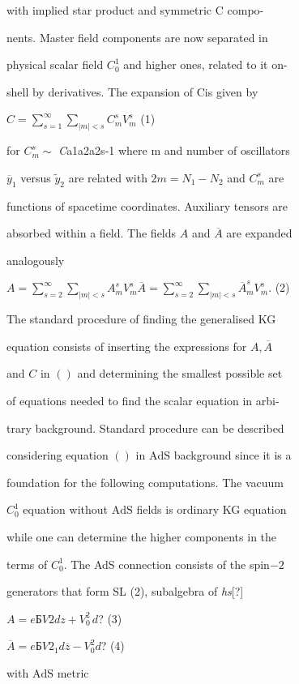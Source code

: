 \documentclass[a4paper,12pt]{article}
\begin{document}
with implied star product and symmetric $\mathrm{C}$ compo-

nents. Master field components are now separated in

physical scalar field $C_{0}^{1}$ and higher ones, related to it on-

shell by derivatives. The expansion of Cis given by
\begin{center}
$C=\displaystyle \sum_{s=1}^{\infty}\sum_{|m|<s}C_{m}^{s}V_{m}^{s}$   (1)
\end{center}
for $ C_{m}^{s}\sim$ {\it C}a1a2a2s-1 where $\mathrm{m}$ and number of oscillators

$\overline{y}_{1}$ versus $\tilde{y}_{2}$ are related with $2m=N_{1}-N_{2}$ and $C_{m}^{s}$ are

functions of spacetime coordinates. Auxiliary tensors are

absorbed within a field. The fields $A$ and $\overline{A}$ are expanded

analogously
\begin{center}
$A=\displaystyle \sum_{s=2}^{\infty}\sum_{|m|<s}A_{m}^{s}V_{m}^{s} \displaystyle \overline{A}=\sum_{s=2}^{\infty}\sum_{|m|<s}\overline{A}_{m}^{s}V_{m}^{s}$.   (2)
\end{center}
The standard procedure of finding the generalised KG

equation consists of inserting the expressions for $A, \overline{A}$

and $C$ in $()$ and determining the smallest possible set

of equations needed to find the scalar equation in arbi-

trary background. Standard procedure can be described

considering equation $()$ in $\mathrm{A}\mathrm{d}\mathrm{S}$ background since it is a

foundation for the following computations. The vacuum

$C_{0}^{1}$ equation without $\mathrm{A}\mathrm{d}\mathrm{S}$ fields is ordinary KG equation

while one can determine the higher components in the

terms of $C_{0}^{1}$. The AdS connection consists of the spin$- 2$

generators that form SL (2), subalgebra of {\it hs}[?]
\begin{center}
$A=eБ V2dz+V_{0\ }^{2}d$?   (3)

$\overline{A}=eБ V2_{1}d\overline{z}-V_{0}^{2} d$?   (4)
\end{center}
with $\mathrm{A}\mathrm{d}\mathrm{S}$ metric
\end{document}
